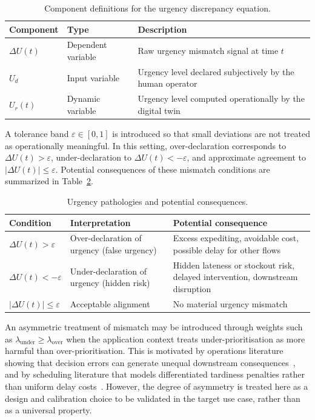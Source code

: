 \begin{table}[H]
\centering
\caption{Component definitions for the urgency discrepancy equation.}
\label{tab:delta_u_components}
\small
\begin{tabularx}{\linewidth}{llX}
\toprule
\textbf{Component} & \textbf{Type} & \textbf{Description} \\
\midrule
$\Delta U(t)$ & Dependent variable & Raw urgency mismatch signal at time $t$ \\
$U_d$         & Input variable     & Urgency level declared subjectively by the human operator \\
$U_r(t)$      & Dynamic variable   & Urgency level computed operationally by the digital twin \\
\bottomrule
\end{tabularx}
\end{table}

A tolerance band $\varepsilon \in [0,1]$ is introduced so that small deviations are not treated as operationally meaningful. In this setting, over-declaration corresponds to $\Delta U(t) > \varepsilon$, under-declaration to $\Delta U(t) < -\varepsilon$, and approximate agreement to $|\Delta U(t)| \le \varepsilon$. Potential consequences of these mismatch conditions are summarized in Table~\ref{tab:pathologies}.

\begin{table}[H]
\centering
\caption{Urgency pathologies and potential consequences.}
\label{tab:pathologies}
\small
\begin{tabularx}{\linewidth}{l >{\raggedright\arraybackslash}X >{\raggedright\arraybackslash}X}
\toprule
\textbf{Condition} & \textbf{Interpretation} & \textbf{Potential consequence} \\
\midrule
$\Delta U(t) > \varepsilon$ & Over-declaration of urgency (false urgency) & Excess expediting, avoidable cost, possible delay for other flows \\[4pt]
$\Delta U(t) < -\varepsilon$ & Under-declaration of urgency (hidden risk) & Hidden lateness or stockout risk, delayed intervention, downstream disruption \\[4pt]
$|\Delta U(t)| \le \varepsilon$ & Acceptable alignment & No material urgency mismatch \\
\bottomrule
\end{tabularx}
\end{table}

An asymmetric treatment of mismatch may be introduced through weights such as $\lambda_{\text{under}} \ge \lambda_{\text{over}}$ when the application context treats under-prioritisation as more harmful than over-prioritisation. This is motivated by operations literature showing that decision errors can generate unequal downstream consequences~\autocite{kim2020admission,diwa2020task}, and by scheduling literature that models differentiated tardiness penalties rather than uniform delay costs~\autocite{baker1982dynamic,chakrabortty2022}. However, the degree of asymmetry is treated here as a design and calibration choice to be validated in the target use case, rather than as a universal property.

